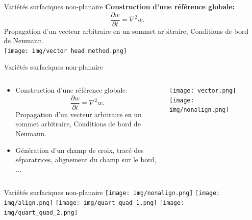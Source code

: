 \begin{frame}{Variétés surfaciques non-planaire}{}
\vspace{-0.5cm}
    {\bf Construction d'une référence globale:}
    \begin{equation*}
        \frac{\partial w}{\partial t} = \nabla^2 w.
        \label{heatequation}
    \end{equation*}
    Propagation d'un vecteur arbitraire en un sommet arbitraire, Conditions de bord de Neumann.\\\vspace{0.2cm}
    \centering
\texttt{[image: img/vector head method.png]}\\
\caption{\footnotesize Vector Heat Method {\color{onera_gray}[K. CRANE et al (2020)]}}
\caption{}
\end{frame}

\begin{frame}{Variétés surfaciques non-planaire}{}
\begin{columns}
\begin{column}{0.5\textwidth}
\begin{itemize}
    \item  Construction d'une référence globale:
    \begin{equation*}
        \frac{\partial w}{\partial t} = \nabla^2 w.
        \label{heatequation}
    \end{equation*}
    Propagation d'un vecteur arbitraire en un sommet arbitraire, Conditions de bord de Neumann.
    \item  Génération d'un champ de croix, tracé des séparatrices, alignement du champ sur le bord, ...
\end{itemize}
\end{column}
\begin{column}{0.5\textwidth}
\centering
\texttt{[image: vector.png]}
\texttt{[image: img/nonalign.png]}
\end{column}
\end{columns}
\end{frame}

\begin{frame}{Variétés surfaciques non-planaire}
\centering
\texttt{[image: img/nonalign.png]}
\texttt{[image: img/align.png]}
\texttt{[image: img/quart\_quad\_1.png]}
\texttt{[image: img/quart\_quad\_2.png]}
\end{frame}


